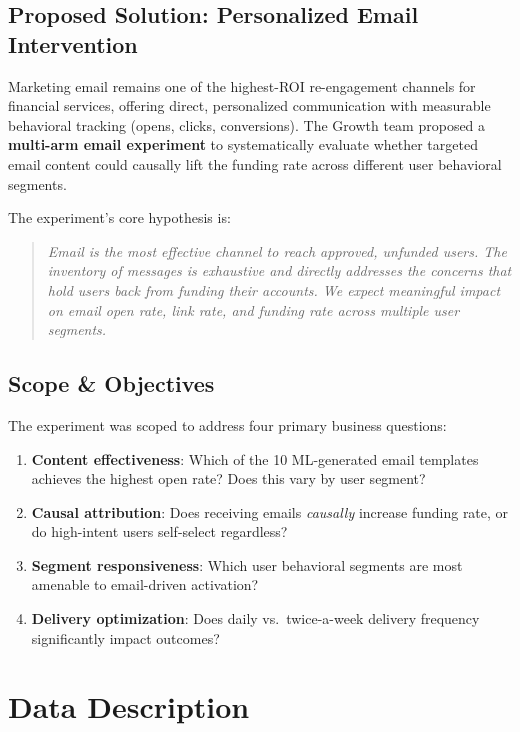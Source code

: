 \documentclass[12pt,a4paper]{article}
\begin{document}
\subsection{Proposed Solution: Personalized Email Intervention}

Marketing email remains one of the highest-ROI re-engagement channels for financial
services, offering direct, personalized communication with measurable behavioral tracking
(opens, clicks, conversions). The Growth team proposed a \textbf{multi-arm email experiment}
to systematically evaluate whether targeted email content could causally lift the
funding rate across different user behavioral segments.

The experiment's core hypothesis is:

\begin{quote}
  \textit{Email is the most effective channel to reach approved, unfunded users. The
  inventory of messages is exhaustive and directly addresses the concerns that hold
  users back from funding their accounts. We expect meaningful impact on email open
  rate, link rate, and funding rate across multiple user segments.}
\end{quote}

\subsection{Scope \& Objectives}

The experiment was scoped to address four primary business questions:

\begin{enumerate}[leftmargin=2em]
  \item \textbf{Content effectiveness}: Which of the 10 ML-generated email templates
    achieves the highest open rate? Does this vary by user segment?
  \item \textbf{Causal attribution}: Does receiving emails \textit{causally} increase
    funding rate, or do high-intent users self-select regardless?
  \item \textbf{Segment responsiveness}: Which user behavioral segments are most
    amenable to email-driven activation?
  \item \textbf{Delivery optimization}: Does daily vs.\ twice-a-week delivery frequency
    significantly impact outcomes?
\end{enumerate}

\clearpage
\section{Data Description}
\end{document}
